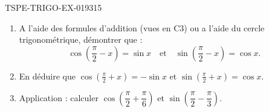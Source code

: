 \begin{exercice}{TSPE-TRIGO-EX-019}{3}{15}
\begin{enumerate}
  \item A l'aide des formules d'addition (vues en C3) ou a l'aide du cercle trigonométrique, démontrer que :
  \[
    \cos\!\left(\frac{\pi}{2} - x\right) = \sin x \quad \text{et} \quad \sin\!\left(\frac{\pi}{2} - x\right) = \cos x.
  \]
  \item En déduire que $\cos\!\left(\frac{\pi}{2} + x\right) = -\sin x$ et $\sin\!\left(\frac{\pi}{2} + x\right) = \cos x$.
  \item Application : calculer $\cos\!\left(\dfrac{\pi}{2} + \dfrac{\pi}{6}\right)$ et $\sin\!\left(\dfrac{\pi}{2} - \dfrac{\pi}{3}\right)$.
\end{enumerate}
\end{exercice}
